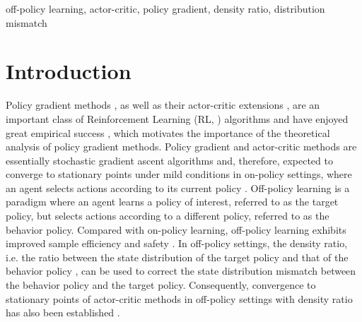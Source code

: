 \documentclass[twoside,11pt]{article}
\numberwithin{assucounter}{section}
\begin{document}
\begin{keywords}
  off-policy learning, actor-critic, policy gradient, density ratio, distribution mismatch
\end{keywords}

\section{Introduction}
Policy gradient methods \citep{williams1992simple}, 
as well as their actor-critic extensions \citep{ sutton2000policy,konda2000actor},
are an important class of Reinforcement Learning  (RL, \citealt{sutton2018reinforcement}) algorithms 
and have enjoyed great empirical success \citep{silver2016mastering, mnih2016asynchronous,vinyals2019grandmaster},
which motivates the importance of the theoretical analysis of policy gradient methods.
Policy gradient and actor-critic methods are essentially stochastic gradient ascent algorithms
and,
therefore, expected to converge to stationary points under mild conditions in on-policy settings,
where an agent selects actions according to its current policy \citep{sutton2000policy,konda2000actor,kumar2019sample,zhang2020global,wu2020finite,xu2020improving,qiu2021finite}.
Off-policy learning is a paradigm where an agent learns a policy of interest, referred to as the target policy,
but selects actions according to a different policy,
referred to as the behavior policy.
Compared with on-policy learning,
off-policy learning exhibits improved sample efficiency \citep{lin1992self,sutton2011horde} and safety \citep{dulac2019challenges}.
In off-policy settings,
the density ratio,
i.e. the ratio between the state distribution of the target policy and that of the behavior policy
\citep{hallak2017consistent,gelada2019off,liu2018breaking,nachum2019dualdice,zhang2020gradientdice},
can be used to correct the state distribution mismatch between the behavior policy and the target policy.
Consequently,
convergence to stationary points of actor-critic methods in off-policy settings with density ratio has also been established \citep{liu2019off,zhang2019provably,huang2021convergence,xu2021doubly}.
\end{document}
